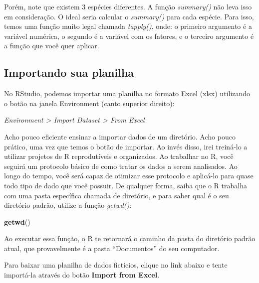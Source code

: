 \documentclass[
]{book}
\newenvironment{Shaded}{\begin{snugshade}}{\end{snugshade}}
\newcommand{\CommentTok}[1]{\textcolor[rgb]{0.56,0.35,0.01}{\textit{#1}}}
\newcommand{\FunctionTok}[1]{\textcolor[rgb]{0.13,0.29,0.53}{\textbf{#1}}}
\newcommand{\NormalTok}[1]{#1}
\newcommand{\SpecialCharTok}[1]{\textcolor[rgb]{0.81,0.36,0.00}{\textbf{#1}}}
\begin{document}
Porém, note que existem 3 espécies diferentes. A função \emph{summary()} não leva isso em consideração. O ideal seria calcular o \emph{summary()} para cada espécie. Para isso, temos uma função muito legal chamada \emph{tapply()}, onde: o primeiro argumento é a variável numérica, o segundo é a variável com os fatores, e o terceiro argumento é a função que você quer aplicar.

\begin{Shaded}
\end{Shaded}

\hypertarget{importando-sua-planilha}{%
\subsection{Importando sua planilha}\label{importando-sua-planilha}}

No RStudio, podemos importar uma planilha no formato Excel (xlsx) utilizando o botão na janela Environment (canto superior direito):

\emph{Environment \textgreater{} Import Dataset \textgreater{} From Excel}

Acho pouco eficiente ensinar a importar dados de um diretório. Acho pouco prático, uma vez que temos o botão de importar. Ao invés disso, irei treiná-lo a utilizar projetos de R reprodutíveis e organizados. Ao trabalhar no R, você seguirá um protocolo básico de como tratar os dados a serem analisados. Ao longo do tempo, você será capaz de otimizar esse protocolo e aplicá-lo para quase todo tipo de dado que você possuir. De qualquer forma, saiba que o R trabalha com uma pasta específica chamada de diretório, e para saber qual é o seu diretório padrão, utilize a função \emph{getwd()}:

\begin{Shaded}
\begin{Highlighting}[]
\FunctionTok{getwd}\NormalTok{()}
\end{Highlighting}
\end{Shaded}

Ao executar essa função, o R te retornará o caminho da pasta do diretório padrão atual, que provavelmente é a pasta ``Documentos'' do seu computador.

Para baixar uma planilha de dados fictícios, clique no link abaixo e tente importá-la através do botão \textbf{Import from Excel}.
\end{document}
